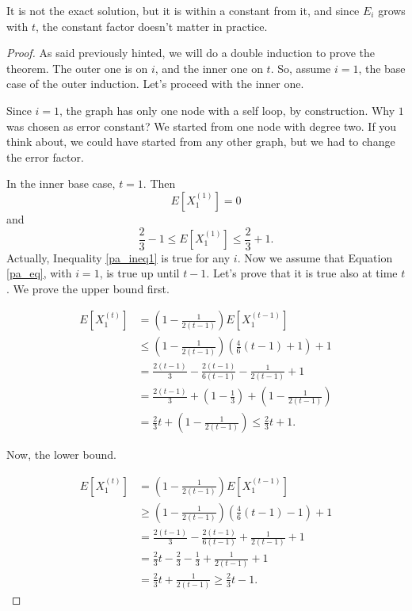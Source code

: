 It is not the exact solution, but it is within a constant from it, and since $E_i$ grows with $t$, the constant factor doesn't matter in practice.
\begin{proof}
As said previously hinted, we will do a double induction to prove the theorem. The outer one is on $i$, and the inner one on $t$. So, assume $i = 1$, the base case of the outer induction. Let's proceed with the inner one.

Since $i = 1$, the graph has only one node with a self loop, by construction. Why $1$ was chosen as error constant? We started from one node with degree two. If you think about, we could have started from any other graph, but we had to change the error factor.
 
In the inner base case, $t = 1$. Then
\begin{equation}
	E[X_1^{(1)}] = 0
\end{equation}
and
\begin{equation}\label{pa_ineq1}
	\frac{2}{3} - 1 \leq E[X_1^{(1)}] \leq \frac{2}{3} + 1.
\end{equation}
Actually, Inequality \ref{pa_ineq1} is true for any $i$. Now we assume that Equation \ref{pa_eq}, with $i=1$, is true up until $t-1$. Let's prove that it is true also at time $t$. We prove the upper bound first.

\begin{align}
E[X_1^{(t)}] &= \left(1 - \frac{1}{2(t-1)}\right)E[X_1^{(t-1)}]\\
&\leq \left(1 - \frac{1}{2(t-1)}\right)\left(\frac{4}{6}(t-1) + 1\right) + 1\tag{By inductive hypotesis}\\
&=\frac{2(t-1)}{3} -\frac{2(t-1)}{6(t-1)} - \frac{1}{2(t-1)} + 1\\
&=\frac{2(t-1)}{3} + \left(1 - \frac{1}{3}\right) + \left(1 - \frac{1}{2(t-1)}\right)\\
&=\frac{2}{3}t + \left(1 -\frac{1}{2(t-1)}\right) \leq \frac{2}{3}t + 1.
\end{align}

Now, the lower bound.


\begin{align}
E[X_1^{(t)}] &= \left(1 - \frac{1}{2(t-1)}\right)E[X_1^{(t-1)}]\\
&\geq \left(1 - \frac{1}{2(t-1)}\right)\left(\frac{4}{6}(t-1) - 1\right) + 1\tag{By inductive hypotesis} \\
&=\frac{2(t-1)}{3} -\frac{2(t-1)}{6(t-1)} + \frac{1}{2(t-1)} + 1\\
&=\frac{2}{3}t - \frac{2}{3} -\frac{1}{3} + \frac{1}{2(t-1)} + 1\\
&=\frac{2}{3}t + \frac{1}{2(t-1)} \geq \frac{2}{3}t - 1.
\end{align}


\end{proof}
